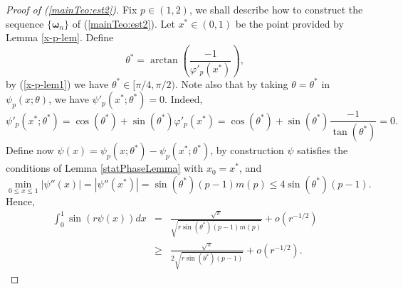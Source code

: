 \documentclass{amsart}
\numberwithin{equation}{section}
\begin{document}
\begin{proof}[Proof of (\ref{mainTeo:est2})]

Fix $p\in(1,2)$, we shall describe how to construct the sequence $\{\boldsymbol{\omega}_n\}$ of (\ref{mainTeo:est2}). Let $x^*\in(0,1)$ be the point provided by Lemma \ref{x-p-lem}.
Define
$$
\theta^*=\arctan\left(\frac{-1}{\varphi'_p(x^*)}\right),
$$
by (\ref{x-p-lem1}) we have $\theta^*\in[\pi/4,\pi/2)$.
Note also that by taking $\theta=\theta^*$ in $\psi_p(x;\theta)$, we have $\psi'_p(x^*;\theta^*)=0$. Indeed,
$$
\psi'_p(x^*;\theta^*)=\cos(\theta^*)+\sin(\theta^*)\varphi'_p(x^*)=\cos(\theta^*)+\sin(\theta^*)\frac{-1}{\tan(\theta^*)}=0.
$$
Define now $\psi(x)=\psi_p(x;\theta^*)-\psi_p(x^*;\theta^*)$, by construction $\psi$ satisfies the conditions of Lemma \ref{statPhaseLemma} with $x_0=x^*$, and
$$
\min_{0\le x\le1}|\psi''(x)|=|\psi''(x^*)|=\sin(\theta^*)(p-1)m(p)\le4\sin(\theta^*)(p-1).
$$
Hence,
\begin{eqnarray}
\nonumber
\int_0^1\sin(r\psi(x))dx&=&\frac{\sqrt{\pi}}{\sqrt{r\sin(\theta^*)(p-1)m(p)}}+o(r^{-1/2})\\
\label{mainTeo:est2Help1}
&\ge&\frac{\sqrt{\pi}}{2\sqrt{r\sin(\theta^*)(p-1)}}+o(r^{-1/2}).
\end{eqnarray}


\end{proof}
\end{document}
